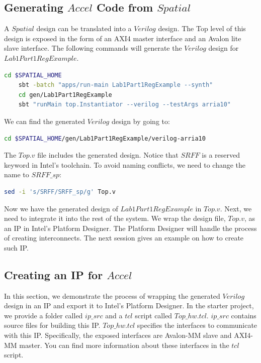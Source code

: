 \documentclass{article}
\begin{document}
    \subsection{Generating $Accel$ Code from $Spatial$}
    A $Spatial$ design can be translated into a $Verilog$ design.
    The Top level of this design is exposed in the form of an AXI4 master interface and an Avalon lite slave interface.
    The following commands will generate the $Verilog$ design for $Lab1Part1RegExample$.
    \begin{lstlisting}[language=bash]
    cd $SPATIAL_HOME
    sbt -batch "apps/run-main Lab1Part1RegExample --synth"
    cd gen/Lab1Part1RegExample
    sbt "runMain top.Instantiator --verilog --testArgs arria10"
    \end{lstlisting}
    
    We can find the generated $Verilog$ design by going to:
    \begin{lstlisting}[language=bash]
    cd $SPATIAL_HOME/gen/Lab1Part1RegExample/verilog-arria10
    \end{lstlisting}
    
    The $Top.v$ file includes the generated design.
    Notice that $SRFF$ is a reserved keyword in Intel's toolchain.
    To avoid naming conflicts, we need to change the name to $SRFF\_sp$:
    \begin{lstlisting}[language=bash]
    sed -i 's/SRFF/SRFF_sp/g' Top.v
    \end{lstlisting}
    
    Now we have the generated design of $Lab1Part1RegExample$ in $Top.v$.
    Next, we need to integrate it into the rest of the system.
    We wrap the design file, $Top.v$, as an IP in Intel's Platform Designer.
    The Platform Designer will handle the process of creating interconnects.
    The next session gives an example on how to create such IP.
    
    \subsection{Creating an IP for $Accel$}
    In this section, we demonstrate the process of wrapping the generated $Verilog$ design
        in an IP and export it to Intel's Platform Designer.
    In the starter project, we provide a folder called $ip\_src$ and a $tcl$ script called $Top\_hw.tcl$.
    $ip\_src$ contains source files for building this IP.
    $Top\_hw.tcl$ specifies the interfaces to communicate with this IP.
    Specifically, the exposed interfaces are Avalon-MM slave and AXI4-MM master.
    You can find more information about these interfaces in the $tcl$ script.
    
\end{document}
